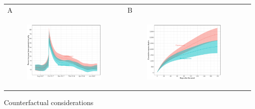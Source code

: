 \documentclass[11pt]{article}
\begin{document}
\begin{suppfigure}[ht]
	\begin{tabular}{lll}
	A&B\\
	\begin{subfigure}[t]{0.49\linewidth}
		\centering
		\includegraphics[width=1\linewidth]{figs/supp-figure-8a.pdf} 
	\end{subfigure}&
	\begin{subfigure}[t]{0.49\linewidth}
		\centering
		\includegraphics[width=1\linewidth]{figs/supp-figure-8b.pdf}
	\end{subfigure}&\\
    \end{tabular}
    \caption{Counterfactual considerations}
    \label{supp-fig:counterfactual-considerations}
\end{suppfigure}
\end{document}

